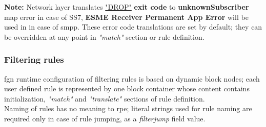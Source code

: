 \documentclass[a4paper,latin]{paper}
\begin{document}
\noindent\textbf{Note:} Network layer translates \underline{"DROP"} \textbf{exit code} to \textbf{unknownSubscriber} \acrshort{map} error in case of SS7, \textbf{ESME Receiver Permanent App Error} 
will be used in in case of \acrshort{smpp}. These error code translations are set by default; they can be overridden at any point in \textit{"match"} section or \gls{rule} definition.

\subsubsection{Filtering rules}
\acrshort{fgn} runtime configuration of filtering \glspl{rule} is based on dynamic block nodes; each user defined \gls{rule} is 
represented by one block container whose content contains initialization, \textit{"match"} and \textit{"translate"} sections of \gls{rule} definition.\\

Naming of \glspl{rule} has no meaning to \acrfull{rpe}; literal strings used for \gls{rule} naming are required only in case of \gls{rule} jumping, 
as a \textit{filter\textunderscore{}jump} field value.\\
\end{document}
